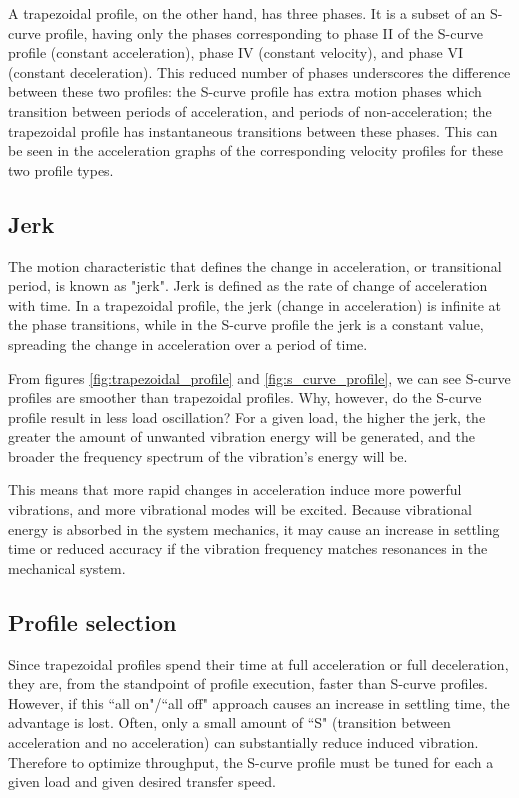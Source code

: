 A trapezoidal profile, on the other hand, has three phases. It is a subset of an
S-curve profile, having only the phases corresponding to phase II of the S-curve
profile (constant acceleration), phase IV (constant velocity), and phase VI
(constant deceleration). This reduced number of phases underscores the
difference between these two profiles: the S-curve profile has extra motion
phases which transition between periods of acceleration, and periods of
non-acceleration; the trapezoidal profile has instantaneous transitions between
these phases. This can be seen in the acceleration graphs of the corresponding
velocity profiles for these two profile types.

\subsection{Jerk}

The motion characteristic that defines the change in acceleration, or
transitional period, is known as "jerk". Jerk is defined as the rate of change
of acceleration with time. In a trapezoidal profile, the jerk (change in
acceleration) is infinite at the phase transitions, while in the S-curve profile
the jerk is a constant value, spreading the change in acceleration over a period
of time.

From figures \ref{fig:trapezoidal_profile} and \ref{fig:s_curve_profile}, we can
see S-curve profiles are smoother than trapezoidal profiles. Why, however, do
the S-curve profile result in less load oscillation? For a given load, the
higher the jerk, the greater the amount of unwanted vibration energy will be
generated, and the broader the frequency spectrum of the vibration's energy will
be.

This means that more rapid changes in acceleration induce more powerful
vibrations, and more vibrational modes will be excited. Because vibrational
energy is absorbed in the system mechanics, it may cause an increase in settling
time or reduced accuracy if the vibration frequency matches resonances in the
mechanical system.

\subsection{Profile selection}

Since trapezoidal profiles spend their time at full acceleration or full
deceleration, they are, from the standpoint of profile execution, faster than
S-curve profiles. However, if this ``all on"/``all off" approach causes an
increase in settling time, the advantage is lost. Often, only a small amount of
``S" (transition between acceleration and no acceleration) can substantially
reduce induced vibration. Therefore to optimize throughput, the S-curve profile
must be tuned for each a given load and given desired transfer speed.

